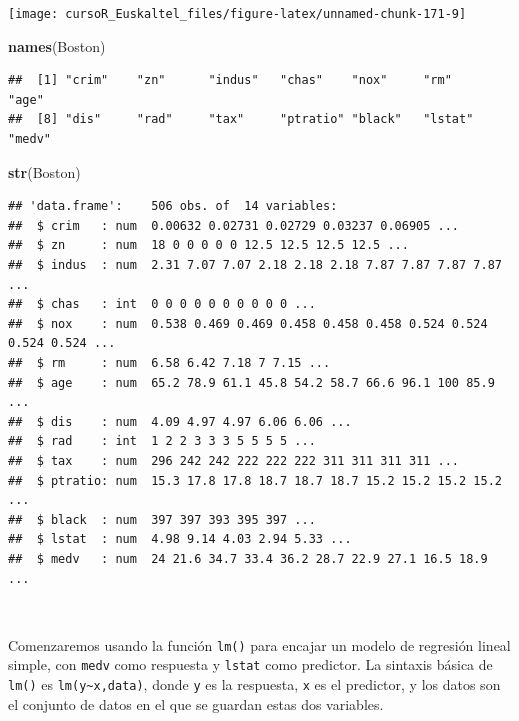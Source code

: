 \documentclass[]{book}
\newenvironment{Shaded}{\begin{snugshade}}{\end{snugshade}}
\newcommand{\KeywordTok}[1]{\textcolor[rgb]{0.13,0.29,0.53}{\textbf{#1}}}
\newcommand{\NormalTok}[1]{#1}
\begin{document}
\begin{center}\texttt{[image: cursoR\_Euskaltel\_files/figure-latex/unnamed-chunk-171-9]} \end{center}

\begin{Shaded}
\begin{Highlighting}[]
\KeywordTok{names}\NormalTok{(Boston)}
\end{Highlighting}
\end{Shaded}

\begin{verbatim}
##  [1] "crim"    "zn"      "indus"   "chas"    "nox"     "rm"      "age"    
##  [8] "dis"     "rad"     "tax"     "ptratio" "black"   "lstat"   "medv"
\end{verbatim}

\begin{Shaded}
\begin{Highlighting}[]
\KeywordTok{str}\NormalTok{(Boston)}
\end{Highlighting}
\end{Shaded}

\begin{verbatim}
## 'data.frame':    506 obs. of  14 variables:
##  $ crim   : num  0.00632 0.02731 0.02729 0.03237 0.06905 ...
##  $ zn     : num  18 0 0 0 0 0 12.5 12.5 12.5 12.5 ...
##  $ indus  : num  2.31 7.07 7.07 2.18 2.18 2.18 7.87 7.87 7.87 7.87 ...
##  $ chas   : int  0 0 0 0 0 0 0 0 0 0 ...
##  $ nox    : num  0.538 0.469 0.469 0.458 0.458 0.458 0.524 0.524 0.524 0.524 ...
##  $ rm     : num  6.58 6.42 7.18 7 7.15 ...
##  $ age    : num  65.2 78.9 61.1 45.8 54.2 58.7 66.6 96.1 100 85.9 ...
##  $ dis    : num  4.09 4.97 4.97 6.06 6.06 ...
##  $ rad    : int  1 2 2 3 3 3 5 5 5 5 ...
##  $ tax    : num  296 242 242 222 222 222 311 311 311 311 ...
##  $ ptratio: num  15.3 17.8 17.8 18.7 18.7 18.7 15.2 15.2 15.2 15.2 ...
##  $ black  : num  397 397 393 395 397 ...
##  $ lstat  : num  4.98 9.14 4.03 2.94 5.33 ...
##  $ medv   : num  24 21.6 34.7 33.4 36.2 28.7 22.9 27.1 16.5 18.9 ...
\end{verbatim}

~

Comenzaremos usando la función \texttt{lm()} para encajar un modelo de
regresión lineal simple, con \texttt{medv} como respuesta y
\texttt{lstat} como predictor. La sintaxis básica de \texttt{lm()} es
\texttt{lm(y\textasciitilde{}x,data)}, donde \texttt{y} es la respuesta,
\texttt{x} es el predictor, y los datos son el conjunto de datos en el
que se guardan estas dos variables.
\end{document}
